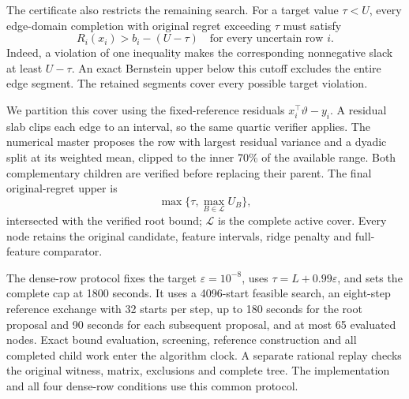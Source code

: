 The certificate also restricts the remaining search. For a target value $\tau<U$, every edge-domain completion with original regret exceeding $\tau$ must satisfy
\begin{equation}
 R_i(x_i)>b_i-(U-\tau)\quad\text{for every uncertain row }i.
 \label{eq:edge-screen-v22}
\end{equation}
Indeed, a violation of one inequality makes the corresponding nonnegative slack at least $U-\tau$. An exact Bernstein upper below this cutoff excludes the entire edge segment. The retained segments cover every possible target violation.

We partition this cover using the fixed-reference residuals $x_i^\top\vartheta-y_i$. A residual slab clips each edge to an interval, so the same quartic verifier applies. The numerical master proposes the row with largest residual variance and a dyadic split at its weighted mean, clipped to the inner 70\% of the available range. Both complementary children are verified before replacing their parent. The final original-regret upper is
\[
 \max\{\tau,\max_{B\in\mathcal L}U_B\},
\]
intersected with the verified root bound; $\mathcal L$ is the complete active cover. Every node retains the original candidate, feature intervals, ridge penalty and full-feature comparator.

The dense-row protocol fixes the target $\varepsilon=10^{-8}$, uses $\tau=L+0.99\varepsilon$, and sets the complete cap at 1800 seconds. It uses a 4096-start feasible search, an eight-step reference exchange with 32 starts per step, up to 180 seconds for the root proposal and 90 seconds for each subsequent proposal, and at most 65 evaluated nodes. Exact bound evaluation, screening, reference construction and all completed child work enter the algorithm clock. A separate rational replay checks the original witness, matrix, exclusions and complete tree. The implementation and all four dense-row conditions use this common protocol.
